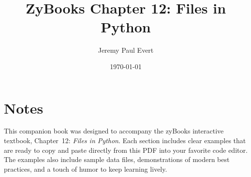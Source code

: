 \documentclass[12pt]{book}
\title{ZyBooks Chapter 12: Files in Python}
\author{Jeremy Paul Evert}
\date{\today}
\begin{document}
\frontmatter
\maketitle
\tableofcontents

\mainmatter











\backmatter
\chapter*{Notes}
This companion book was designed to accompany the zyBooks interactive textbook, Chapter~12: \textit{Files in Python}.  
Each section includes clear examples that are ready to copy and paste directly from this PDF into your favorite code editor.  
The examples also include sample data files, demonstrations of modern best practices, and a touch of humor to keep learning lively.
\end{document}
